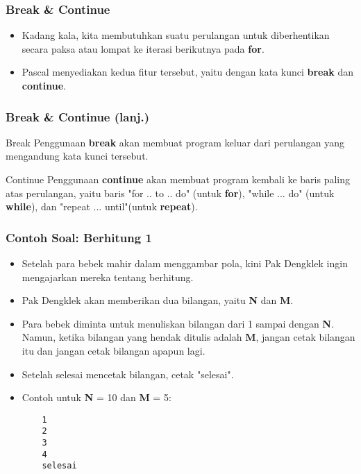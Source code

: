 \begin{frame}
\frametitle{Break \& Continue}
\begin{itemize}
  \item Kadang kala, kita membutuhkan suatu perulangan untuk diberhentikan secara paksa atau lompat ke iterasi berikutnya pada \textbf{for}.
  \item Pascal menyediakan kedua fitur tersebut, yaitu dengan kata kunci \alert{\textbf{break}} dan \alert{\textbf{continue}}.
\end{itemize}
\end{frame}

\begin{frame}
\frametitle{Break \& Continue (lanj.)}
\begin{block}{Break}
Penggunaan \textbf{break} akan membuat program keluar dari perulangan yang mengandung kata kunci tersebut.
\end{block}
\begin{block}{Continue}
Penggunaan \textbf{continue} akan membuat program kembali ke baris paling atas perulangan, yaitu baris "for .. to .. do" (untuk \textbf{for}), "while ... do" (untuk \textbf{while}), dan "repeat ... until"(untuk \textbf{repeat}).
\end{block}
\end{frame}

\begin{frame}[fragile]
\frametitle{Contoh Soal: Berhitung 1}
\begin{itemize}
  \item Setelah para bebek mahir dalam menggambar pola, kini Pak Dengklek ingin mengajarkan mereka tentang berhitung.
  \item Pak Dengklek akan memberikan dua bilangan, yaitu \textbf{N} dan \textbf{M}.
  \item Para bebek diminta untuk menuliskan bilangan dari 1 sampai dengan \textbf{N}. Namun, ketika bilangan yang hendak ditulis adalah \textbf{M}, jangan cetak bilangan itu dan jangan cetak bilangan apapun lagi.
  \item Setelah selesai mencetak bilangan, cetak "selesai".
  \item Contoh untuk \textbf{N} = 10 dan \textbf{M} = 5:
  \begin{lstlisting}
    1
    2
    3
    4
    selesai
  \end{lstlisting}
\end{itemize}
\end{frame}

